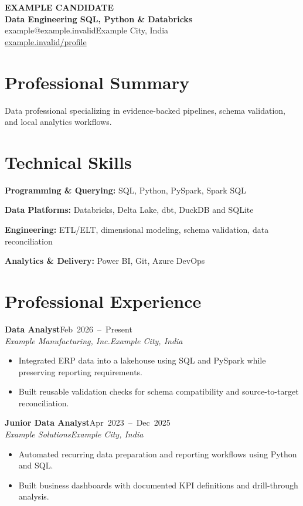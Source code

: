 \documentclass[a4paper,11pt]{article}
\newcommand{\role}[4]{\Needspace{5\baselineskip}\textbf{#1}\hfill\mbox{#2}\\
  \textit{#3}\hfill\textit{#4}\par}
\begin{document}
\begin{center}
  {\Huge\bfseries\color{primary} EXAMPLE CANDIDATE}\\[5pt]
  {\large\bfseries\color{secondary} Data Engineering \textbar{} SQL, Python \& Databricks}\\[6pt]
  \small example@example.invalid\enspace\textbar{}\enspace Example City, India\\[2pt]
  \href{https://example.invalid/profile}{example.invalid/profile}
\end{center}

\section*{Professional Summary}
Data professional specializing in evidence-backed pipelines, schema validation, and local analytics workflows.

\section*{Technical Skills}
\textbf{Programming \& Querying:} SQL, Python, PySpark, Spark SQL\par\vspace{3pt}
\textbf{Data Platforms:} Databricks, Delta Lake, dbt, DuckDB and SQLite\par\vspace{3pt}
\textbf{Engineering:} ETL/ELT, dimensional modeling, schema validation, data reconciliation\par\vspace{3pt}
\textbf{Analytics \& Delivery:} Power BI, Git, Azure DevOps

\section*{Professional Experience}
\role{Data Analyst}{Feb 2026 -- Present}{Example Manufacturing, Inc.}{Example City, India}
\begin{itemize}
  \item Integrated ERP data into a lakehouse using SQL and PySpark while preserving reporting requirements.
  \item Built reusable validation checks for schema compatibility and source-to-target reconciliation.
\end{itemize}
\role{Junior Data Analyst}{Apr 2023 -- Dec 2025}{Example Solutions}{Example City, India}
\begin{itemize}
  \item Automated recurring data preparation and reporting workflows using Python and SQL.
  \item Built business dashboards with documented KPI definitions and drill-through analysis.
\end{itemize}
\end{document}

